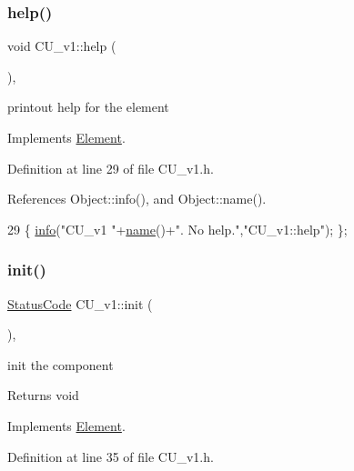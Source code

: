 \subsubsection{\texorpdfstring{help()}{help()}}
{\footnotesize\ttfamily void C\+U\+\_\+v1\+::help (\begin{DoxyParamCaption}{ }\end{DoxyParamCaption})\hspace{0.3cm}{\ttfamily [inline]}, {\ttfamily [virtual]}}

printout help for the element 

Implements \hyperlink{classElement_a32c0de27acb08e17251cef88c3e9303a}{Element}.



Definition at line 29 of file C\+U\+\_\+v1.\+h.



References Object\+::info(), and Object\+::name().


\begin{DoxyCode}
29 \{ \hyperlink{classObject_a644fd329ea4cb85f54fa6846484b84a8}{info}(\textcolor{stringliteral}{"CU\_v1 "}+\hyperlink{classObject_a300f4c05dd468c7bb8b3c968868443c1}{name}()+\textcolor{stringliteral}{". No help."},\textcolor{stringliteral}{"CU\_v1::help"}); \};
\end{DoxyCode}
\mbox{\label{classCU__v1_a67278e2e8dcbd9b1e3a0284605f4103c}} 
\subsubsection{\texorpdfstring{init()}{init()}}
{\footnotesize\ttfamily \hyperlink{classStatusCode}{Status\+Code} C\+U\+\_\+v1\+::init (\begin{DoxyParamCaption}{ }\end{DoxyParamCaption})\hspace{0.3cm}{\ttfamily [inline]}, {\ttfamily [virtual]}}

init the component

\begin{DoxyReturn}{Returns}
void 
\end{DoxyReturn}


Implements \hyperlink{classElement_af42754b5cabc198869222725218d695c}{Element}.



Definition at line 35 of file C\+U\+\_\+v1.\+h.




